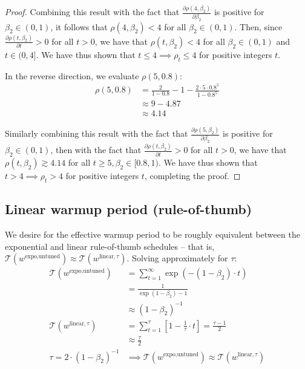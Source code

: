 {\begin{proof}
Combining this result with the fact that $\frac{\partial \rho(4, \beta_2)}{\partial \beta_2}$ is positive for $\beta_2 \in (0, 1)$, it follows that $\rho(4, \beta_2) < 4$ for all $\beta_2 \in (0, 1)$. Then, since $\frac{\partial \rho(t, \beta_2)}{\partial t} > 0$ for all $t > 0$, we have that $\rho(t, \beta_2) < 4$ for all $\beta_2 \in (0, 1)$ and $t \in (0, 4]$. We have thus shown that $t \leq 4 \implies \rho_t \leq 4$ for positive integers $t$.

In the reverse direction, we evaluate $\rho(5, 0.8)$:
\begin{align*}
    \rho(5, 0.8) &= \frac{2}{1 - 0.8} - 1 - \frac{2 \cdot 5 \cdot {0.8}^5}{1 - {0.8}^5} \\
    &\approx 9 - 4.87 \\
    &\approx 4.14
\end{align*}

Similarly combining this result with the fact that $\frac{\partial \rho(5, \beta_2)}{\partial \beta_2}$ is positive for $\beta_2 \in (0, 1)$, then with the fact that $\frac{\partial \rho(t, \beta_2)}{\partial t} > 0$ for all $t > 0$, we have that $\rho(t, \beta_2) \gtrsim 4.14$ for all $t \geq 5, \beta_2 \in [0.8, 1)$. We have thus shown that $t > 4 \implies \rho_t > 4$ for positive integers $t$, completing the proof.

\end{proof}

\subsection{Linear warmup period (rule-of-thumb)}
\label{apx:misc-derivations-linear-exp-equivalence}

We desire for the effective warmup period to be roughly equivalent between the exponential and linear rule-of-thumb schedules -- that is, $\mathcal{T}(w^{\text{expo}, \text{untuned}}) \approx \mathcal{T}(w^{\text{linear}, \tau})$. Solving approximately for $\tau$:
\begin{align*}
    \mathcal{T}(w^{\text{expo}, \text{untuned}}) &= \sum_{t = 1}^\infty \exp \left( - (1 - \beta_2) \cdot t \right) \\
    &= \frac{1}{\exp \left( 1 - \beta_2 \right) - 1} \\
    & \approx (1 - \beta_2)^{-1} \\
    \mathcal{T}(w^{\text{linear}, \tau}) &= \sum_{t = 1}^{\tau} \left[ 1 - \frac{1}{\tau} \cdot t \right] = \frac{\tau - 1}{2} \\
    &\approx \frac{\tau}{2} \\
    \tau = 2 \cdot \left(1 - \beta_2\right)^{-1} &\implies \mathcal{T}(w^{\text{expo}, \text{untuned}}) \approx \mathcal{T}(w^{\text{linear}, \tau})
\end{align*}  \newpage
}
